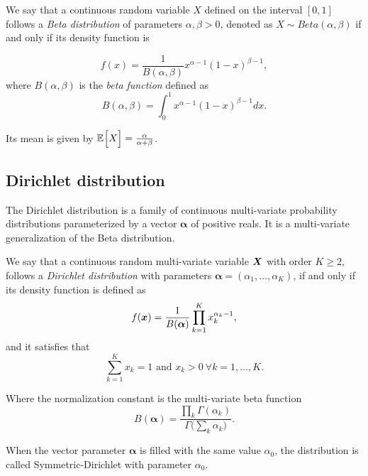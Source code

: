 \begin{definition}
We say that a continuous random variable \(X\) defined on the
interval \([0,1]\) follows a \emph{Beta distribution} of parameters \(\alpha,
\beta > 0\), denoted as \(X \sim Beta(\alpha, \beta)\) if and only if its
density function is

\[
  f(x) = \frac{1}{B(\alpha, \beta)}x^{\alpha - 1}(1-x)^{\beta -1},
\]
where \(B(\alpha, \beta)\) is the \emph{beta function} defined as
\[
  B(\alpha, \beta) = \int_0^1 x^{\alpha - 1}(1-x)^{\beta -1} dx.
\]
\end{definition}

Its mean is given by \(\mathbb{E}_{}\Big[X\Big] = \frac{\alpha}{\alpha + \beta}\).

\subsection*{Dirichlet distribution}

The Dirichlet distribution is a family of continuous multi-variate probability
distributions parameterized by a vector \(\bm{\alpha}\) of positive reals. It is
a multi-variate generalization of the Beta distribution.

\begin{definition}
  We say that a continuous random multi-variate variable \(\bm{X}\) with order
  \(K \geq 2\), follows a \emph{Dirichlet
    distribution} with parameters \(\bm{\alpha} = (\alpha_{1}, \dots, \alpha_{K})\), if and
  only if its density function is defined as
  \[
    f(\bm{x}) = \frac{1}{B(\bm{\alpha})}\prod_{k = 1}^{K}x_{k}^{\alpha_{k}-1},
  \]
  and it satisfies that
  \[
    \sum_{k=1}^{K} x_{k} = 1 \text{ and } x_{k} > 0 \ \forall k=1,\dots,K.
  \]
\end{definition}

Where the normalization constant is the multi-variate beta function
\[
  B(\bm{\alpha}) = \frac{\prod_{k} \Gamma (\alpha_{k})}{\Gamma \big( \sum_{k}\alpha_{k} \big)}.
\]

When the vector parameter \(\bm{\alpha}\) is filled with the same value \(\alpha_{0}\), the distribution is called Symmetric-Dirichlet with parameter \(\alpha_{0}\).

